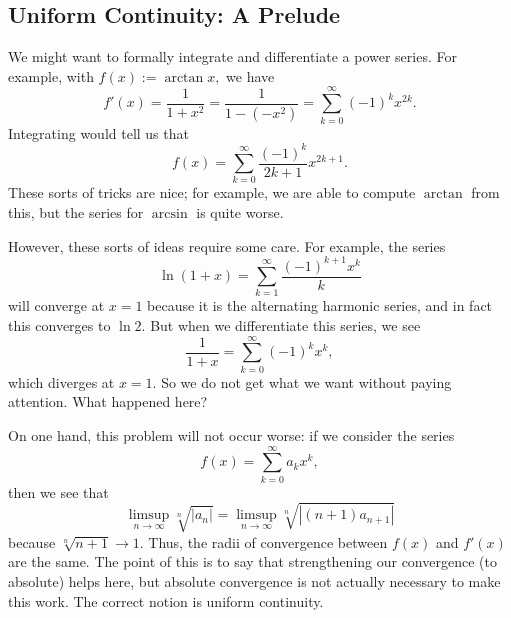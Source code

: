 \documentclass[../notes.tex]{subfiles}
\begin{document}
\subsection{Uniform Continuity: A Prelude}
We might want to formally integrate and differentiate a power series. For example, with $f(x):=\arctan x,$ we have
\[f'(x)=\frac1{1+x^2}=\frac1{1-\left(-x^2\right)}=\sum_{k=0}^\infty(-1)^kx^{2k}.\]
Integrating would tell us that
\[f(x)=\sum_{k=0}^\infty\frac{(-1)^k}{2k+1}x^{2k+1}.\]
These sorts of tricks are nice; for example, we are able to compute $\arctan$ from this, but the series for $\arcsin$ is quite worse.

However, these sorts of ideas require some care. For example, the series
\[\ln(1+x)=\sum_{k=1}^\infty\frac{(-1)^{k+1}x^k}k\]
will converge at $x=1$ because it is the alternating harmonic series, and in fact this converges to $\ln2.$ But when we differentiate this series, we see
\[\frac1{1+x}=\sum_{k=0}^\infty(-1)^kx^k,\]
which diverges at $x=1.$ So we do not get what we want without paying attention. What happened here?

On one hand, this problem will not occur worse: if we consider the series
\[f(x)=\sum_{k=0}^\infty a_kx^k,\]
then we see that
\[\limsup_{n\to\infty}\sqrt[n]{|a_n|}=\limsup_{n\to\infty}\sqrt[n]{|(n+1)a_{n+1}|}\]
because $\sqrt[n]{n+1}\to1.$ Thus, the radii of convergence between $f(x)$ and $f'(x)$ are the same. The point of this is to say that strengthening our convergence (to absolute) helps here, but absolute convergence is not actually necessary to make this work. The correct notion is uniform continuity.
\end{document}
